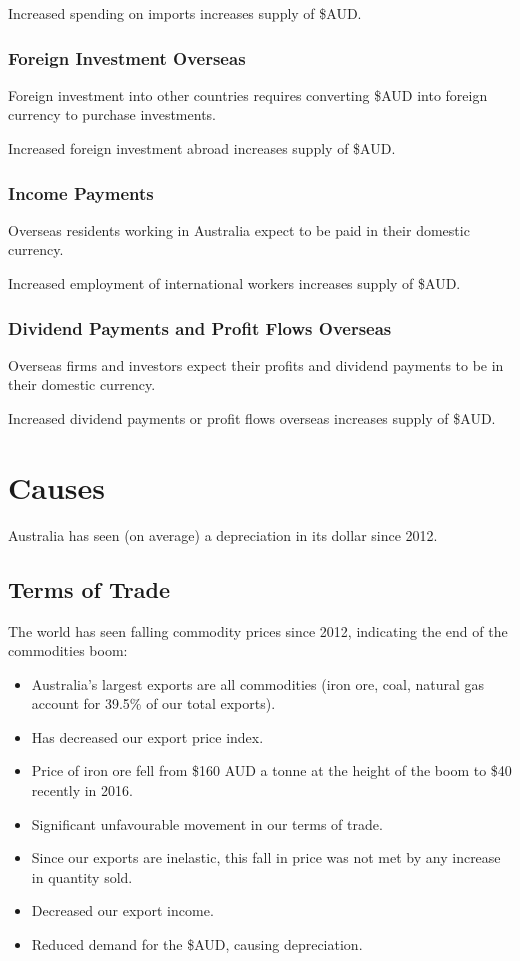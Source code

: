 \documentclass[a4paper,11pt]{article}
\begin{document}
Increased spending on imports increases supply of \$AUD.


\subsubsection{Foreign Investment Overseas}

Foreign investment into other countries requires converting \$AUD into foreign
currency to purchase investments.

Increased foreign investment abroad increases supply of \$AUD.


\subsubsection{Income Payments}

Overseas residents working in Australia expect to be paid in their domestic
currency.

Increased employment of international workers increases supply of \$AUD.


\subsubsection{Dividend Payments and Profit Flows Overseas}

Overseas firms and investors expect their profits and dividend payments to be
in their domestic currency.

Increased dividend payments or profit flows overseas increases supply of \$AUD.




\section{Causes}

Australia has seen (on average) a depreciation in its dollar since 2012.


\subsection{Terms of Trade}

The world has seen falling commodity prices since 2012, indicating the end of
the commodities boom:

\begin{itemize}
\item Australia's largest exports are all commodities (iron ore, coal, natural
	gas account for 39.5\% of our total exports).
\item Has decreased our export price index.
\item Price of iron ore fell from \$160 AUD a tonne at the height of the boom
	to \$40 recently in 2016.
\item Significant unfavourable movement in our terms of trade.
\item Since our exports are inelastic, this fall in price was not met by any
	increase in quantity sold.
\item Decreased our export income.
\item Reduced demand for the \$AUD, causing depreciation.
\end{itemize}
\end{document}
